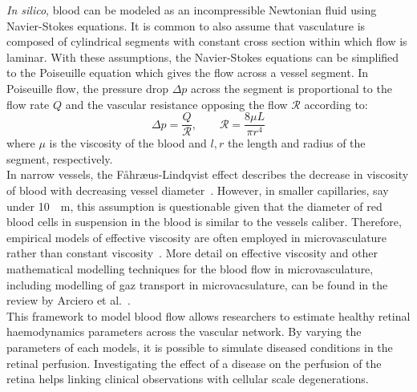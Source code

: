 \documentclass[12pt,a4paper]{article}
\begin{document}
\textit{In silico}, blood can be modeled as an incompressible Newtonian fluid using Navier-Stokes equations.
It is common to also assume that vasculature is composed of cylindrical segments with constant cross section within which flow is laminar.
With these assumptions, the Navier-Stokes equations can be simplified to the Poiseuille equation which gives the flow across a vessel segment.
In Poiseuille flow, the pressure drop $\Delta p$ across the segment is proportional to the flow rate $Q$ and the vascular resistance opposing the flow $\mathcal{R}$ according to:
\begin{equation}
  \label{eq:PoiseuilleLaw}
  \Delta p = \frac{Q}{\mathcal{R}}, \qquad \mathcal{R} = \frac{8\mu L}{\pi r^4} 
\end{equation}
where $\mu$ is the viscosity of the blood and $l, r$ the length and radius of the segment, respectively.\\
In narrow vessels, the F\r{a}hr\ae us-Lindqvist effect describes the decrease in viscosity of blood with decreasing vessel diameter~\cite{F_hr_us_1931}.
However, in smaller capillaries, say under \SI{10}{\mu\meter}, this assumption is questionable given that the diameter of red blood cells in suspension in the blood is similar to the vessels caliber.
Therefore, empirical models of effective viscosity are often employed in microvasculature rather than constant viscosity~\cite{Pries_1990, Haynes_1960}.
More detail on effective viscosity and other mathematical modelling techniques for the blood flow in microvasculature, including modelling of gaz transport in microvacsulature, can be found in the review by Arciero et al.~\cite{C_Arciero_2017}. \\
This framework to model blood flow allows researchers to estimate healthy retinal haemodynamics parameters across the vascular network.
By varying the parameters of each models, it is possible to simulate diseased conditions in the retinal perfusion.
Investigating the effect of a disease on the perfusion of the retina helps linking clinical observations with cellular scale degenerations.
\end{document}
